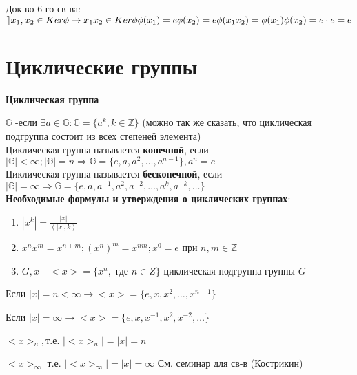 \documentclass[12pt]{article}
\begin{document}
			Док-во 6-го св-ва:$\rceil x_1, x_2 \in Ker\phi \rightarrow x_1 x_2 \in Ker\phi \\
			\phi (x_1)=e \\
			\phi (x_2)=e \\
			\phi (x_1x_2)=\phi (x_1) \phi (x_2)=e\cdot e=e$
			
		
		\newtheorem{Th}{Теорема}
		\newtheorem{Def}{Определение}
		

		
		
		
		
		
		
		
		\newpage
		\section{Циклические группы}
				\hypertarget{indef:circle_group}{\textbf{Циклическая группа}} $\mathds{G}$ -если $ \exists a \in \mathds{G} : \mathds{G}=\{a^k, k \in \mathds{Z} \}$ (можно так же сказать, что циклическая подгруппа состоит из всех степеней элемента) \\
				Циклическая группа называется \hypertarget{indef:inf_circle_group}{\textbf{конечной}}, если $|\mathds{G}|<\infty; |\mathds{G}|=n \Rightarrow \mathds{G}=\{e,a,a^2, \dots , a^{n-1} \}, a^n=e$\\
				Циклическая группа называется \hypertarget{indef:noninf_circle_gtoup}{\textbf{бесконечной}}, если $|\mathds{G}|= \infty \Rightarrow \mathds{G}=\{ e,a,a^{-1},a^2,a^{-2}, \dots, a^k, a^{-k}, \dots \}$\\
				\hypertarget{f:circle}{\textbf{Необходимые формулы и утверждения о циклических группах}}:
				\begin{enumerate}
					\item $|x^k|=\frac{|x|}{(|x|,k)}$
					\item $x^n x^m=x^{n+m}; (x^n)^m=x^{nm}; x^0=e$ при $n,m \in \mathds{Z}$
					\item$G,x \quad <x>=\{x^n,\text{ где } n\in Z\}$-циклическая подгруппа группы $G$
					
				\end{enumerate} 
					
					Если $|x|=n<\infty \rightarrow <x>= \{e,x,x^2, \dots, x^{n-1} \}$
					
					Если $|x|=\infty \rightarrow <x>=\{e,x,x^{-1},x^2, x^{-2}, \dots \}$ 
					
					$<x>_n, $т.е. $|<x>_n|=|x|=n$
					
					$<x>_\infty$ т.е. $|<x>_\infty|=|x|=\infty$ См. семинар для св-в (Кострикин)
					
\end{document}
